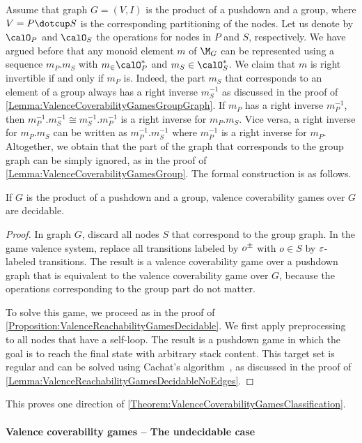 \documentclass[../../diss.tex]{subfiles}
\begin{document}
Assume that graph $G = (V,I)$ is the product of a pushdown and a group, where $V = P \dotcup S$ is the corresponding partitioning of the nodes.
Let us denote by $\ops_P$ and $\ops_S$ the operations for nodes in $P$ and $S$, respectively.
We have argued before that any monoid element $m$ of $\graphmonoid$ can be represented using a sequence $m_P.m_S$ with $m_ \in \ops_P^*$ and $m_S \in \ops_S^*$.
We claim that $m$ is right invertible if and only if $m_P$ is.
Indeed, the part $m_S$ that corresponds to an element of a group always has a right inverse $m_S^{-1}$ as discussed in the proof of \cref{Lemma:ValenceCoverabilityGamesGroupGraph}.
If $m_P$ has a right inverse $m_P^{-1}$, then $m_P^{-1} . m_S^{-1} \cong  m_S^{-1} .m_P^{-1}$ is a right inverse for $m_P.m_S$.
Vice versa, a right inverse for $m_P.m_S$ can be written as $m_P^{-1} . m_S^{-1}$ where $m_P^{-1}$ is a right inverse for $m_P$.
Altogether, we obtain that the part of the graph that corresponds to the group graph can be simply ignored, as in the proof of \cref{Lemma:ValenceCoverabilityGamesGroup}.
The formal construction is as follows.

\begin{proposition}
    If $G$ is the product of a pushdown and a group, valence coverability games over $G$ are decidable.
\end{proposition}

\begin{proof}
    In graph $G$, discard all nodes $S$ that correspond to the group graph.
    In the game valence system, replace all transitions labeled by ${o}^\pm$ with $o \in S$ by $\varepsilon$-labeled transitions.
    The result is a valence coverability game over a pushdown graph that is equivalent to the valence coverability game over $G$, because the operations corresponding to the group part do not matter.

    To solve this game, we proceed as in the proof of \cref{Proposition:ValenceReachabilityGamesDecidable}.
    We first apply preprocessing to all nodes that have a self-loop.
    The result is a pushdown game in which the goal is to reach the final state with arbitrary stack content.
    This target set is regular and can be solved using Cachat's algorithm~\cite{Cachat02}, as discussed in the proof of \cref{Lemma:ValenceReachabilityGamesDecidableNoEdges}.
\end{proof}

This proves one direction of \cref{Theorem:ValenceCoverabilityGamesClassification}.

\paragraph{Valence coverability games -- The undecidable case}
\end{document}
